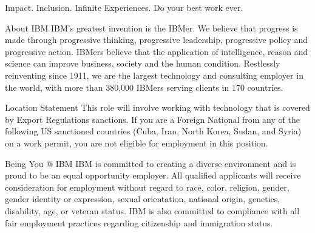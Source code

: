 Impact. Inclusion. Infinite Experiences. Do your best work ever.


About IBM
IBM’s greatest invention is the IBMer. We believe that progress is made through progressive thinking, progressive leadership, progressive policy and progressive action. IBMers believe that the application of intelligence, reason and science can improve business, society and the human condition. Restlessly reinventing since 1911, we are the largest technology and consulting employer in the world, with more than 380,000 IBMers serving clients in 170 countries.


Location Statement
This role will involve working with technology that is covered by Export Regulations sanctions. If you are a Foreign National from any of the following US sanctioned countries (Cuba, Iran, North Korea, Sudan, and Syria) on a work permit, you are not eligible for employment in this position.


Being You @ IBM
IBM is committed to creating a diverse environment and is proud to be an equal opportunity employer. All qualified applicants will receive consideration for employment without regard to race, color, religion, gender, gender identity or expression, sexual orientation, national origin, genetics, disability, age, or veteran status. IBM is also committed to compliance with all fair employment practices regarding citizenship and immigration status.

